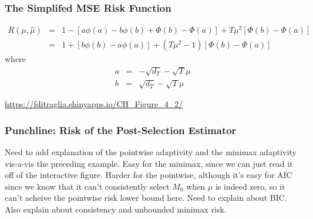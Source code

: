 \begin{frame}
  \frametitle{The Simplifed MSE Risk Function}
	\begin{eqnarray*}
    R(\mu,\widehat{\mu}) &=& 1 - \left[a\phi(a) - b\phi(b) + \Phi(b) - \Phi(a) \right] + T\mu^2 \left[\Phi(b) - \Phi(a) \right]\\
		&=&1 + \left[b\phi(b) - a\phi(a)\right]  + (T\mu^2 - 1) \left[\Phi(b) - \Phi(a) \right] 
	\end{eqnarray*}
where
	\begin{eqnarray*}
		a &=& -\sqrt{d_T} - \sqrt{T}\mu\\
		b &=& \sqrt{d_T} - \sqrt{T}\mu
	\end{eqnarray*}

\url{https://fditraglia.shinyapps.io/CH\_Figure\_4\_2/}
\end{frame}
\begin{frame}
  \frametitle{Punchline: Risk of the Post-Selection Estimator}

Need to add explanation of the pointwise adaptivity and the minimax adaptivity vis-a-vis the preceding example.
Easy for the minimax, since we can just read it off of the interactive figure.
Harder for the pointwise, although it's easy for AIC since we know that it can't consistently select $M_0$ when $\mu$ is indeed zero, so it can't acheive the pointwise risk lower bound here.
Need to explain about BIC.
Also explain about consistency and unbounded minimax risk.

\end{frame}

